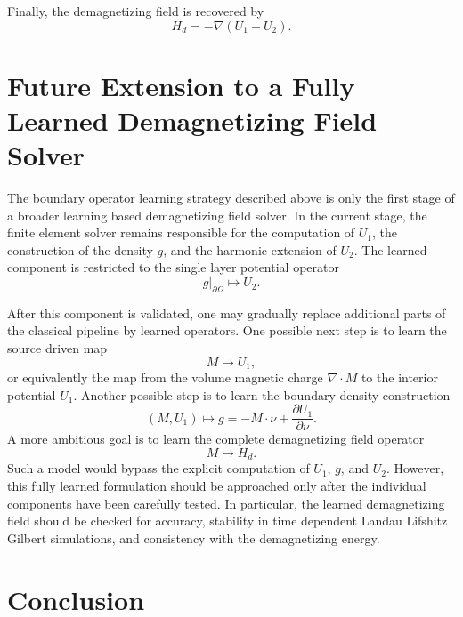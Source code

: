\documentclass[11pt]{article}
\numberwithin{equation}{section}
\begin{document}
Finally, the demagnetizing field is recovered by
\begin{equation}
    H_d = -\nabla (U_1+U_2).
\end{equation}

\section{Future Extension to a Fully Learned Demagnetizing Field Solver}

The boundary operator learning strategy described above is only the first stage of a broader learning based demagnetizing field solver. In the current stage, the finite element solver remains responsible for the computation of \(U_1\), the construction of the density \(g\), and the harmonic extension of \(U_2\). The learned component is restricted to the single layer potential operator
\begin{equation}
    g|_{\partial\Omega}
    \longmapsto
    U_2.
\end{equation}

After this component is validated, one may gradually replace additional parts of the classical pipeline by learned operators. One possible next step is to learn the source driven map
\begin{equation}
    M \longmapsto U_1,
\end{equation}
or equivalently the map from the volume magnetic charge \(\nabla\cdot M\) to the interior potential \(U_1\). Another possible step is to learn the boundary density construction
\begin{equation}
    (M,U_1)
    \longmapsto
    g
    =
    -M\cdot\nu+\frac{\partial U_1}{\partial\nu}.
\end{equation}
A more ambitious goal is to learn the complete demagnetizing field operator
\begin{equation}
    M
    \longmapsto
    H_d.
\end{equation}
Such a model would bypass the explicit computation of \(U_1\), \(g\), and \(U_2\). However, this fully learned formulation should be approached only after the individual components have been carefully tested. In particular, the learned demagnetizing field should be checked for accuracy, stability in time dependent Landau Lifshitz Gilbert simulations, and consistency with the demagnetizing energy.

\section{Conclusion}
\end{document}
